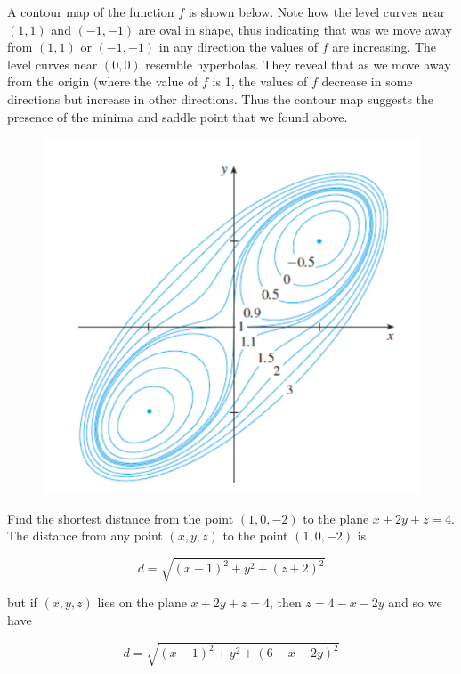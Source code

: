         A contour map of the function $f$ is shown below. Note how the level curves near $(1,1)$ and $(-1,-1)$ are oval in shape, thus indicating that was we move away from $(1,1)$ or $(-1,-1)$ in any direction the 
        values of $f$ are increasing. The level curves near $(0,0)$ resemble hyperbolas. They reveal that as we move away from the origin (where the value of $f$ is 1, the values of $f$ decrease in some directions but
        increase in other directions. Thus the contour map suggests the presence of the minima and saddle point that we found above.

        \begin{figure}[hbt!]
            \centering
            \includegraphics[scale = 0.75]{Resources/14.7_Example_Contour}
        \end{figure}

        \textit{} Find the shortest distance from the point $(1,0,-2)$ to the plane $x+2y + z = 4$. \\

        The distance from any point $(x,y,z)$ to the point $(1,0,-2)$ is

        \[
            d = \sqrt{(x-1)^2 + y^2 + (z+2)^2}
        \]

        but if $(x,y,z)$ lies on the plane $x+2y + z = 4$, then $z=4 - x - 2y$ and so we have

        \[
            d = \sqrt{(x-1)^2 + y^2 + (6-x-2y)^2}
        \]

